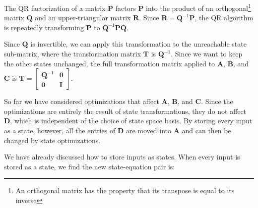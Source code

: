 The QR factorization of a matrix $\mathbf{P}$ factors $\mathbf{P}$
into the product of an orthogonal\footnote{An orthogonal matrix has
the property that its transpose is equal to its inverse} matrix
$\mathbf{Q}$ and an upper-triangular matrix $\mathbf{R}$. Since
$\mathbf{R} = \mathbf{Q}^{-1}
\mathbf{P}$, the QR algorithm is repeatedly transforming
$\mathbf{P}$ to $\mathbf{Q}^{-1} \mathbf{P} \mathbf{Q}$.

Since $\mathbf{Q}$ is invertible, we can apply this
transformation to the unreachable state sub-matrix, where the
transformation matrix $\mathbf{T}$ is $\mathbf{Q}^{-1}$. Since we
want to keep the other states unchanged, the full transformation
matrix applied to $\mathbf{A}$, $\mathbf{B}$, and $\mathbf{C}$ is
$\mathbf{T} = \left [ \begin{array} {cc} \mathbf{Q}^{-1} &
\mathbf{0} \\ \mathbf{0} & \mathbf{I} \end{array} \right ]$.


So far we have considered optimizations that affect $\mathbf{A}$,
$\mathbf{B}$, and $\mathbf{C}$. Since the optimizations are entirely
the result of state transformations, they do not affect $\mathbf{D}$,
which is independent of the choice of state space basis. By storing
every input as a state, however, all the entries of $\mathbf{D}$ are
moved into $\mathbf{A}$ and can then be changed by state
optimizations.

We have already discussed how to store inputs as states. When every
input is stored as a state, we find the new state-equation pair is:

